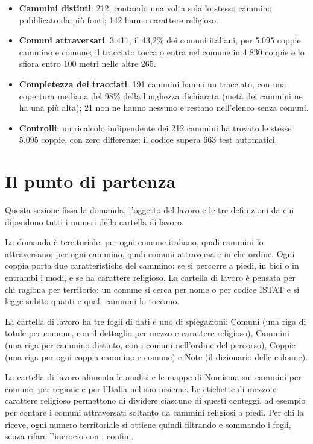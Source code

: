 \begin{riquadro}
\begin{itemize}
\item \textbf{Cammini distinti}: 212, contando una volta sola lo stesso cammino pubblicato da più fonti; 142 hanno carattere religioso.
\item \textbf{Comuni attraversati}: 3.411, il 43,2\% dei comuni italiani, per 5.095 coppie cammino e comune; il tracciato tocca o entra nel comune in 4.830 coppie e lo sfiora entro 100 metri nelle altre 265.
\item \textbf{Completezza dei tracciati}: 191 cammini hanno un tracciato, con una copertura mediana del 98\% della lunghezza dichiarata (metà dei cammini ne ha una più alta); 21 non ne hanno nessuno e restano nell'elenco senza comuni.
\item \textbf{Controlli}: un ricalcolo indipendente dei 212 cammini ha trovato le stesse 5.095 coppie, con zero differenze; il codice supera 663 test automatici.
\end{itemize}
\end{riquadro}

\tableofcontents

\section{Il punto di partenza}\label{sec:partenza}

Questa sezione fissa la domanda, l'oggetto del lavoro e le tre definizioni da cui dipendono tutti i numeri della cartella di lavoro.

La domanda è territoriale: per ogni comune italiano, quali cammini lo attraversano; per ogni cammino, quali comuni attraversa e in che ordine. Ogni coppia porta due caratteristiche del cammino: se si percorre a piedi, in bici o in entrambi i modi, e se ha carattere religioso. La cartella di lavoro è pensata per chi ragiona per territorio: un comune si cerca per nome o per codice ISTAT e si legge subito quanti e quali cammini lo toccano.

La cartella di lavoro ha tre fogli di dati e uno di spiegazioni: Comuni (una riga di totale per comune, con il dettaglio per mezzo e carattere religioso), Cammini (una riga per cammino distinto, con i comuni nell'ordine del percorso), Coppie (una riga per ogni coppia cammino e comune) e Note (il dizionario delle colonne).

La cartella di lavoro alimenta le analisi e le mappe di Nomisma sui cammini per comune, per regione e per l'Italia nel suo insieme. Le etichette di mezzo e carattere religioso permettono di dividere ciascuno di questi conteggi, ad esempio per contare i comuni attraversati soltanto da cammini religiosi a piedi. Per chi la riceve, ogni numero territoriale si ottiene quindi filtrando e sommando i fogli, senza rifare l'incrocio con i confini.

